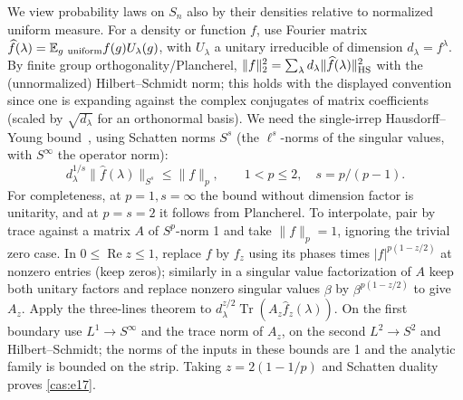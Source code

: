 We view probability laws on \(S_n\) also by their densities relative to normalized uniform measure. For a density or function \(f\), use Fourier matrix \(\widehat f(\lambda)=\mathbb E_{g\ {\rm uniform}} f(g) U_\lambda(g)\), with \(U_\lambda\) a unitary irreducible of dimension \(d_\lambda=f^\lambda\). By finite group orthogonality/Plancherel, \(\|f\|_2^2=\sum_\lambda d_\lambda\|\widehat f(\lambda)\|_{\rm HS}^2\) with the (unnormalized) Hilbert--Schmidt norm; this holds with the displayed convention since one is expanding against the complex conjugates of matrix coefficients (scaled by \(\sqrt{d_\lambda}\) for an orthonormal basis). We need the single-irrep Hausdorff--Young bound~\cite[Lemma~5.1(1)]{garcia-cuerva-parcet2004}, using Schatten norms \(S^s\) (the \(\ell^s\)-norms of the singular values, with \(S^\infty\) the operator norm):
\begin{equation}
d_\lambda^{1/s}\|\widehat f(\lambda)\|_{S^s}\le\|f\|_{p},
\qquad 1<p\le2,\quad s=p/(p-1).
\label{cas:e17}
\end{equation}
For completeness, at \(p=1,s=\infty\) the bound without dimension factor is unitarity, and at \(p=s=2\) it follows from Plancherel. To interpolate, pair by trace against a matrix \(A\) of \(S^p\)-norm 1 and take \(\|f\|_p=1\), ignoring the trivial zero case. In \(0\le\operatorname{Re}z\le1\), replace \(f\) by \(f_z\) using its phases times \(|f|^{p(1-z/2)}\) at nonzero entries (keep zeros); similarly in a singular value factorization of \(A\) keep both unitary factors and replace nonzero singular values \(\beta\) by \(\beta^{p(1-z/2)}\) to give \(A_z\). Apply the three-lines theorem to \(d_\lambda^{z/2}\operatorname{Tr}(A_z\widehat f_z(\lambda))\). On the first boundary use \(L^1\to S^\infty\) and the trace norm of \(A_z\), on the second \(L^2\to S^2\) and Hilbert--Schmidt; the norms of the inputs in these bounds are 1 and the analytic family is bounded on the strip. Taking \(z=2(1-1/p)\) and Schatten duality proves \eqref{cas:e17}.

